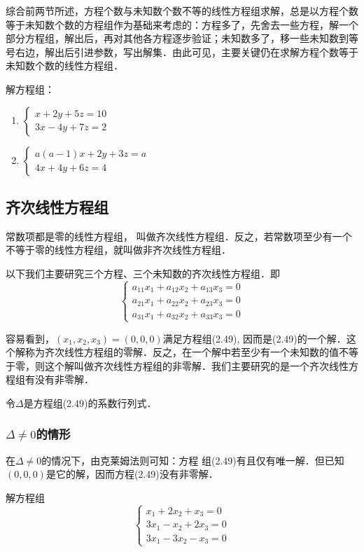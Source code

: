 综合前两节所述，方程个数与未知数个数不等的线性方程组求解，总是以方程个数等于未知数个数的方程组作为基础来考虑的：方程多了，先舍去一些方程，解一个部分方程组，解出后，再对其他各方程逐步验证；未知数多了，移一些未知数到等号右边，解出后引进参数，写出解集．由此可见，主要关键仍在求解方程个数等于未知数个数的线性方程组．

\begin{ex}
解方程组：
\begin{multicols}{2}
 \begin{enumerate}
    \item $\begin{cases}
        x+2y+5z=10\\3x-4y+7z=2
    \end{cases}$
    \item $\begin{cases}
        a(a-1)x+2y+3z=a\\ 4x+4y+6z=4
    \end{cases}$
\end{enumerate}   
\end{multicols}
\end{ex}

\subsection{齐次线性方程组}
常数项都是零的线性方程组，
叫做齐次线性方程组．反之，若常数项至少有一个不等于零的线性方程组，就叫做非齐次线性方程组．

以下我们主要研究三个方程、三个未知数的齐次线性方程组．即
\begin{equation}
    \begin{cases}
a_{11}x_1+a_{12}x_2+a_{13}x_3=0\\
a_{21}x_1+a_{22}x_2+a_{23}x_3=0\\
a_{31}x_1+a_{32}x_2+a_{33}x_3=0
    \end{cases}
\end{equation}

容易看到，$(x_1,x_2,x_3)=(0, 0, 0)$满足方程组(2.49), 因而是(2.49)的一个解．这个解称为齐次线性方程组的零解．反之，在一个解中若至少有一个未知数的值不等于零，则这个解叫做齐次线性方程组的非零解．我们主要研究的是一个齐次线性方程组有没有非零解．

令$\Delta$是方程组(2.49)的系数行列式．

\subsubsection{$\Delta\ne 0$的情形}
在$\Delta\ne 0$的情况下，由克莱姆法则可知：方程
组(2.49)有且仅有唯一解．但已知$(0, 0, 0)$是它的解，因而方程(2.49)没有非零解．
\begin{example}
解方程组 \[\begin{cases}
    x_1+2x_2+x_3=0\\
3x_1-x_2+2x_3=0\\
3x_1-3x_2-x_3=0
\end{cases}\]
\end{example}

